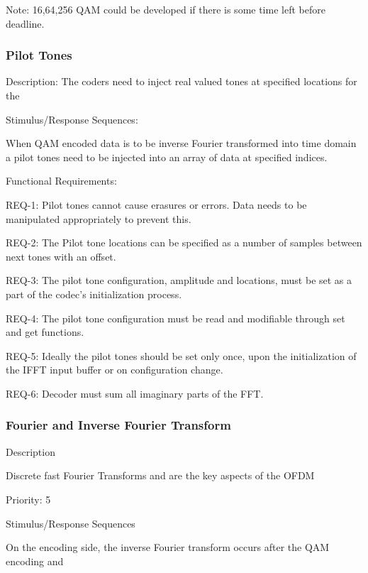 \documentclass[]{report}
\begin{document}
Note: 16,64,256 QAM could be developed if there is some time left before deadline.

\subsubsection{Pilot Tones}

Description:
The coders need to inject real valued tones at specified locations for the \par

Stimulus/Response Sequences: \par
When QAM encoded data is to be inverse Fourier transformed into time domain a pilot tones need to be injected into an array of data at specified indices. \par

Functional Requirements: \par

REQ-1: Pilot tones cannot cause erasures or errors. Data needs to be manipulated appropriately to prevent this. \par
REQ-2: The Pilot tone locations can be specified as a number of samples between next tones with an offset. \par
REQ-3: The pilot tone configuration, amplitude and locations, must be set as a part of the codec's initialization process. \par
REQ-4: The pilot tone configuration must be read and modifiable through set and get functions. \par
REQ-5: Ideally the pilot tones should be set only once, upon the initialization of the IFFT input buffer or on configuration change. \par
REQ-6: Decoder must sum all imaginary parts of the FFT. \par


\subsubsection{Fourier and Inverse Fourier Transform}

Description \par
Discrete fast Fourier Transforms and are the key aspects of the OFDM \par

Priority: 5

Stimulus/Response Sequences \par
On the encoding side, the inverse Fourier transform occurs after the QAM encoding and  \par
\end{document}
